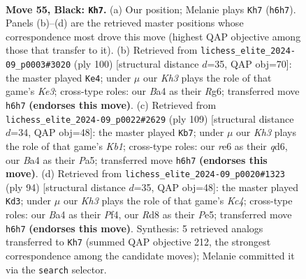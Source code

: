 \documentclass[11pt]{article}
\begin{document}
\clearpage

\begin{figure}[p]\centering
\begin{subfigure}{0.46\textwidth}\centering
\resizebox{\linewidth}{!}{%
\newchessgame
\chessboard[
  setfen={1r1r4/8/pp2R2k/8/bP6/P4B1K/8/6R1 b - - 13 55},
  showmover=false,
  pgfstyle=straightmove, color=movearrow, markmove={h6-h7}
]}
\caption{}
\end{subfigure}\hfill
\begin{subfigure}{0.46\textwidth}\centering
\resizebox{\linewidth}{!}{%
\newchessgame
\chessboard[
  setfen={2k5/8/6R1/5P1p/7P/1r2KP2/4R3/5r2 w - - 3 51},
  showmover=false,
  pgfstyle=straightmove, color=movearrow, markmove={e3-e4}
]}
\caption{}
\end{subfigure}
\\[4pt]
\begin{subfigure}{0.46\textwidth}\centering
\resizebox{\linewidth}{!}{%
\newchessgame
\chessboard[
  setfen={1k5r/7r/3Q1p2/pP6/5PP1/8/1P4K1/2R5 b - - 6 55},
  showmover=false,
  pgfstyle=straightmove, color=movearrow, markmove={b8-b7}
]}
\caption{}
\end{subfigure}\hfill
\begin{subfigure}{0.46\textwidth}\centering
\resizebox{\linewidth}{!}{%
\newchessgame
\chessboard[
  setfen={8/8/4p2p/k3Pp2/2KR1P1P/8/2r5/8 w - - 2 48},
  showmover=false,
  pgfstyle=straightmove, color=movearrow, markmove={c4-d3}
]}
\caption{}
\end{subfigure}
\caption{\textbf{Move 55, Black: \texttt{Kh7}.} (a) Our position; Melanie plays \texttt{Kh7} (\texttt{h6h7}). Panels (b)--(d) are the retrieved master positions whose correspondence most drove this move (highest QAP objective among those that transfer to it). (b) Retrieved from \texttt{lichess\_elite\_2024-09\_p0003\#3020} (ply 100) [structural distance $d$=35, QAP obj=70]: the master played \texttt{Ke4}; under $\mu$ our \emph{Kh3} plays the role of that game's \emph{Ke3}; cross-type roles: our \emph{B}a4 as their \emph{R}g6; transferred move \texttt{h6h7} \textbf{(endorses this move)}. (c) Retrieved from \texttt{lichess\_elite\_2024-09\_p0022\#2629} (ply 109) [structural distance $d$=34, QAP obj=48]: the master played \texttt{Kb7}; under $\mu$ our \emph{Kh3} plays the role of that game's \emph{Kb1}; cross-type roles: our \emph{r}e6 as their \emph{q}d6, our \emph{B}a4 as their \emph{P}a5; transferred move \texttt{h6h7} \textbf{(endorses this move)}. (d) Retrieved from \texttt{lichess\_elite\_2024-09\_p0020\#1323} (ply 94) [structural distance $d$=35, QAP obj=48]: the master played \texttt{Kd3}; under $\mu$ our \emph{Kh3} plays the role of that game's \emph{Kc4}; cross-type roles: our \emph{B}a4 as their \emph{P}f4, our \emph{R}d8 as their \emph{P}e5; transferred move \texttt{h6h7} \textbf{(endorses this move)}. Synthesis: 5 retrieved analogs transferred to \texttt{Kh7} (summed QAP objective 212, the strongest correspondence among the candidate moves); Melanie committed it via the \texttt{search} selector.}
\label{fig:thought-m109}
\end{figure}
\end{document}
